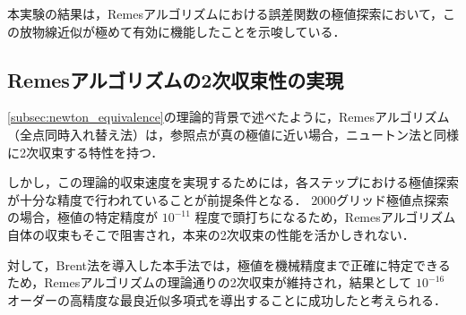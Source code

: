 本実験の結果は，Remesアルゴリズムにおける誤差関数の極値探索において，この放物線近似が極めて有効に機能したことを示唆している．

\subsection{Remesアルゴリズムの2次収束性の実現}

\ref{subsec:newton_equivalence}の理論的背景で述べたように，Remesアルゴリズム（全点同時入れ替え法）は，参照点が真の極値に近い場合，ニュートン法と同様に2次収束する特性を持つ\cite{seminar-note}．

しかし，この理論的収束速度を実現するためには，各ステップにおける極値探索が十分な精度で行われていることが前提条件となる．
$2000$グリッド極値点探索の場合，極値の特定精度が $10^{-11}$ 程度で頭打ちになるため，Remesアルゴリズム自体の収束もそこで阻害され，本来の2次収束の性能を活かしきれない．

対して，Brent法を導入した本手法では，極値を機械精度まで正確に特定できるため，Remesアルゴリズムの理論通りの2次収束が維持され，結果として $10^{-16}$ オーダーの高精度な最良近似多項式を導出することに成功したと考えられる．
